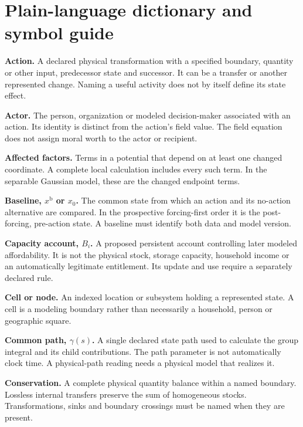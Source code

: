 \chapter*{Plain-language dictionary and symbol guide}

\textbf{Action.} A declared physical transformation with a specified boundary, quantity or other input, predecessor state and successor. It can be a transfer or another represented change. Naming a useful activity does not by itself define its state effect.

\textbf{Actor.} The person, organization or modeled decision-maker associated with an action. Its identity is distinct from the action's field value. The field equation does not assign moral worth to the actor or recipient.

\textbf{Affected factors.} Terms in a potential that depend on at least one changed coordinate. A complete local calculation includes every such term. In the separable Gaussian model, these are the changed endpoint terms.

\textbf{Baseline, $x^{\mathrm{b}}$ or $x_0$.} The common state from which an action and its no-action alternative are compared. In the prospective forcing-first order it is the post-forcing, pre-action state. A baseline must identify both data and model version.

\textbf{Capacity account, $B_i$.} A proposed persistent account controlling later modeled affordability. It is not the physical stock, storage capacity, household income or an automatically legitimate entitlement. Its update and use require a separately declared rule.

\textbf{Cell or node.} An indexed location or subsystem holding a represented state. A cell is a modeling boundary rather than necessarily a household, person or geographic square.

\textbf{Common path, $\gamma(s)$.} A single declared state path used to calculate the group integral and its child contributions. The path parameter is not automatically clock time. A physical-path reading needs a physical model that realizes it.

\textbf{Conservation.} A complete physical quantity balance within a named boundary. Lossless internal transfers preserve the sum of homogeneous stocks. Transformations, sinks and boundary crossings must be named when they are present.


